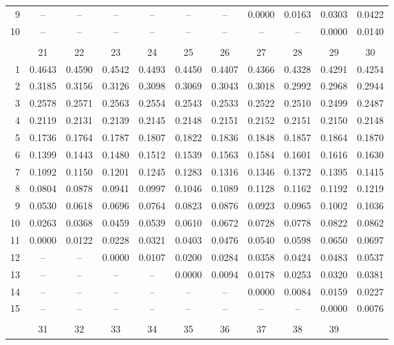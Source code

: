 \documentclass[draft]{article}
\begin{document}
\begin{table}
\begin{center}
\begin{tabular}{rcccccccccc}
 9&   -- &   -- &   -- &   -- &   -- &   -- &0.0000&0.0163&0.0303&0.0422\\
10&   -- &   -- &   -- &   -- &   -- &   -- &   -- &   -- &0.0000&0.0140\\
\\
  & \multicolumn{1}{c}{21}
  & \multicolumn{1}{c}{22}
  & \multicolumn{1}{c}{23}
  & \multicolumn{1}{c}{24}
  & \multicolumn{1}{c}{25}
  & \multicolumn{1}{c}{26}
  & \multicolumn{1}{c}{27}
  & \multicolumn{1}{c}{28}
  & \multicolumn{1}{c}{29}
  & \multicolumn{1}{c}{30} \\ \cline{2-11}
 1&0.4643&0.4590&0.4542&0.4493&0.4450&0.4407&0.4366&0.4328&0.4291&0.4254\\
 2&0.3185&0.3156&0.3126&0.3098&0.3069&0.3043&0.3018&0.2992&0.2968&0.2944\\
 3&0.2578&0.2571&0.2563&0.2554&0.2543&0.2533&0.2522&0.2510&0.2499&0.2487\\
 4&0.2119&0.2131&0.2139&0.2145&0.2148&0.2151&0.2152&0.2151&0.2150&0.2148\\
 5&0.1736&0.1764&0.1787&0.1807&0.1822&0.1836&0.1848&0.1857&0.1864&0.1870\\
 6&0.1399&0.1443&0.1480&0.1512&0.1539&0.1563&0.1584&0.1601&0.1616&0.1630\\
 7&0.1092&0.1150&0.1201&0.1245&0.1283&0.1316&0.1346&0.1372&0.1395&0.1415\\
 8&0.0804&0.0878&0.0941&0.0997&0.1046&0.1089&0.1128&0.1162&0.1192&0.1219\\
 9&0.0530&0.0618&0.0696&0.0764&0.0823&0.0876&0.0923&0.0965&0.1002&0.1036\\
10&0.0263&0.0368&0.0459&0.0539&0.0610&0.0672&0.0728&0.0778&0.0822&0.0862\\
11&0.0000&0.0122&0.0228&0.0321&0.0403&0.0476&0.0540&0.0598&0.0650&0.0697\\
12&  --  &  --  &0.0000&0.0107&0.0200&0.0284&0.0358&0.0424&0.0483&0.0537\\
13&  --  &  --  &  --  &  --  &0.0000&0.0094&0.0178&0.0253&0.0320&0.0381\\
14&  --  &  --  &  --  &  --  &  --  &  --  &0.0000&0.0084&0.0159&0.0227\\
15&  --  &  --  &  --  &  --  &  --  &  --  &  --  &  --  &0.0000&0.0076\\
\\
  & \multicolumn{1}{c}{31}
  & \multicolumn{1}{c}{32}
  & \multicolumn{1}{c}{33}
  & \multicolumn{1}{c}{34}
  & \multicolumn{1}{c}{35}
  & \multicolumn{1}{c}{36}
  & \multicolumn{1}{c}{37}
  & \multicolumn{1}{c}{38}
  & \multicolumn{1}{c}{39}

\end{tabular}
\end{center}
\end{table}
\end{document}
